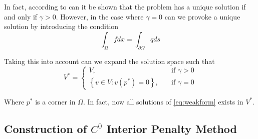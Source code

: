 In fact, according to \cite{gu2012c0} can it be shown that the problem has a unique solution if and only if $\gamma >
0$. However, in the case where $\gamma  = 0$ can we provoke a unique solution by introducing the condition \[
\int_{\Omega }^{} f dx = \int_{\partial \Omega }^{}  q ds
\]

Taking this into account can we expand the solution space such that \[
V^* = \begin{cases}
    V, \quad & \text{if } \gamma >0 \\
    \left\{ v \in V: v\left( p^* \right) = 0 \right\}, \quad & \text{if } \gamma  =0
\end{cases}
\]

Where $p^{*}$  is a corner in $\Omega $. In fact, now all solutions of \eqref{eq:weakform} exists in $V^{*}$.


\subsection{Construction of $C^{0}$ Interior Penalty Method}%
\label{sub:construction_interior_penalty_method}

